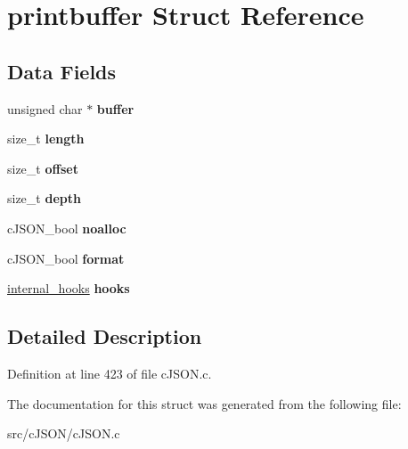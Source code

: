 \hypertarget{structprintbuffer}{}\section{printbuffer Struct Reference}
\label{structprintbuffer}
\subsection*{Data Fields}
\begin{DoxyCompactItemize}
\item 
\mbox{\label{structprintbuffer_a754f63618e91db99f7ab6cfc4e629013}} 
unsigned char $\ast$ {\bfseries buffer}
\item 
\mbox{\label{structprintbuffer_a1a679f8b6fe9b413fb3a87203b0f5bc8}} 
size\+\_\+t {\bfseries length}
\item 
\mbox{\label{structprintbuffer_a3ed6f9d24d6591047680492a962dc7c9}} 
size\+\_\+t {\bfseries offset}
\item 
\mbox{\label{structprintbuffer_aa7311b5da38ff8d1737824c611b48732}} 
size\+\_\+t {\bfseries depth}
\item 
\mbox{\label{structprintbuffer_aa2a7966b71dc3535e4e3789c33ec5368}} 
c\+J\+S\+O\+N\+\_\+bool {\bfseries noalloc}
\item 
\mbox{\label{structprintbuffer_a75d3f480f5308e7f4afecf30e11277ef}} 
c\+J\+S\+O\+N\+\_\+bool {\bfseries format}
\item 
\mbox{\label{structprintbuffer_a43a8b3bcc644432f12f5aed5159d2520}} 
\hyperlink{structinternal__hooks}{internal\+\_\+hooks} {\bfseries hooks}
\end{DoxyCompactItemize}


\subsection{Detailed Description}


Definition at line 423 of file c\+J\+S\+O\+N.\+c.



The documentation for this struct was generated from the following file\+:\begin{DoxyCompactItemize}
\item 
src/c\+J\+S\+O\+N/c\+J\+S\+O\+N.\+c\end{DoxyCompactItemize}
